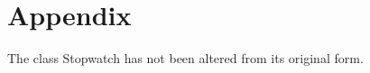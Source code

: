 \documentclass[onecolumn, 12pt, article]{IEEEtran}
\numberwithin{case}{problem}
\numberwithin{condition}{problem}
\numberwithin{condition}{subsection}
\numberwithin{definition}{section}
\theoremstyle{remark}
\numberwithin{question}{problem}
\theoremstyle{plain}
\numberwithin{answer}{problem}
\numberwithin{solution}{section}
\numberwithin{equation}{section}%
\begin{document}
\section*{Appendix}




The class Stopwatch has not been altered from its original form.
\newline



\end{document}
